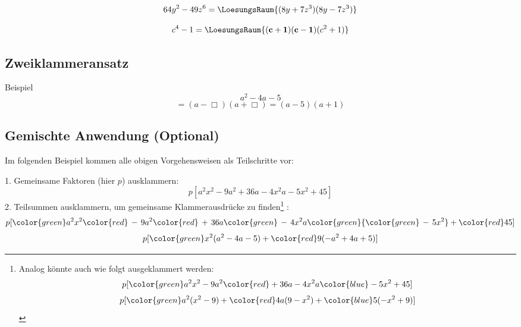 $$64y^2 - 49z^6 = \LoesungsRaum{(8y+7z^3)(8y-7z^3)}$$

$$c^4 - 1 = \LoesungsRaum{\mathbf{(c+1)(c-1)}(c^2+1)}$$


\newpage



\subsection{Zweiklammeransatz}
Beispiel $$a^2-4a-5$$
$$=(a-\Box{})(a+\Box{}) = (a-5)(a+1)$$





\newpage
\subsection{Gemischte Anwendung (Optional)}
Im folgenden Beispiel kommen alle obigen Vorgehensweisen als
Teilschritte vor:

\begin{center}{}\end{center}


1. Gemeinsame Faktoren (hier $p$) ausklammern:
$$p[a^2x^2 - 9a^2 + 36a -4x^2a -5x^2 + 45]$$
2. Teilsummen ausklammern, um gemeinsame Klammerausdrücke zu finden\footnote{
Analog könnte auch wie folgt ausgeklammert werden:
$$p[{\color{green}a^2x^2 -9a^2} {\color{red}+ 36a -4x^2a} {\color{blue}- 5x^2 + 45}]$$
$$p[{\color{green}a^2}(x^2 - 9) + {\color{red}4a}(9 - x^2) + {\color{blue}5}(-x^2 + 9)]$$
}
:
$$p[{\color{green}a^2x^2 } {\color{red}\, -\, 9a^2} {\color{red}\, +\, 36a} {\color{green}\, -\, 4x^2a} {\color{green} {\color{green}\,-\,5x^2} } + {\color{red}45}]$$
$$p[{\color{green}x^2} (a^2 -4a -5) + {\color{red}9}(-a^2 + 4a +5)]$$

